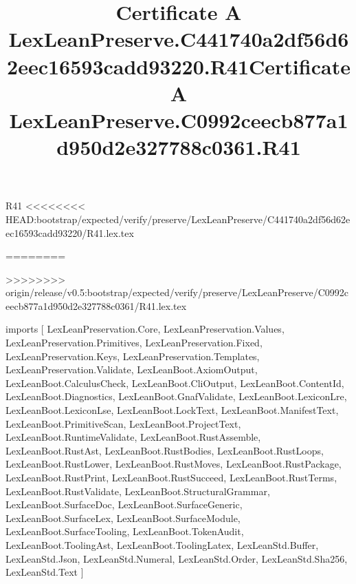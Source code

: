 \begin{lexlean}{R41}
<<<<<<<< HEAD:bootstrap/expected/verify/preserve/LexLeanPreserve/C441740a2df56d62eec16593cadd93220/R41.lex.tex
\title{Certificate A LexLeanPreserve.C441740a2df56d62eec16593cadd93220.R41}
========
\title{Certificate A LexLeanPreserve.C0992ceecb877a1d950d2e327788c0361.R41}
>>>>>>>> origin/release/v0.5:bootstrap/expected/verify/preserve/LexLeanPreserve/C0992ceecb877a1d950d2e327788c0361/R41.lex.tex
\begin{coremodule}
imports [
  LexLeanPreservation.Core,
  LexLeanPreservation.Values,
  LexLeanPreservation.Primitives,
  LexLeanPreservation.Fixed,
  LexLeanPreservation.Keys,
  LexLeanPreservation.Templates,
  LexLeanPreservation.Validate,
  LexLeanBoot.AxiomOutput,
  LexLeanBoot.CalculusCheck,
  LexLeanBoot.CliOutput,
  LexLeanBoot.ContentId,
  LexLeanBoot.Diagnostics,
  LexLeanBoot.GnafValidate,
  LexLeanBoot.LexiconLre,
  LexLeanBoot.LexiconLse,
  LexLeanBoot.LockText,
  LexLeanBoot.ManifestText,
  LexLeanBoot.PrimitiveScan,
  LexLeanBoot.ProjectText,
  LexLeanBoot.RuntimeValidate,
  LexLeanBoot.RustAssemble,
  LexLeanBoot.RustAst,
  LexLeanBoot.RustBodies,
  LexLeanBoot.RustLoops,
  LexLeanBoot.RustLower,
  LexLeanBoot.RustMoves,
  LexLeanBoot.RustPackage,
  LexLeanBoot.RustPrint,
  LexLeanBoot.RustSucceed,
  LexLeanBoot.RustTerms,
  LexLeanBoot.RustValidate,
  LexLeanBoot.StructuralGrammar,
  LexLeanBoot.SurfaceDoc,
  LexLeanBoot.SurfaceGeneric,
  LexLeanBoot.SurfaceLex,
  LexLeanBoot.SurfaceModule,
  LexLeanBoot.SurfaceTooling,
  LexLeanBoot.TokenAudit,
  LexLeanBoot.ToolingAst,
  LexLeanBoot.ToolingLatex,
  LexLeanStd.Buffer,
  LexLeanStd.Json,
  LexLeanStd.Numeral,
  LexLeanStd.Order,
  LexLeanStd.Sha256,
  LexLeanStd.Text
]


\end{coremodule}
\end{lexlean}
